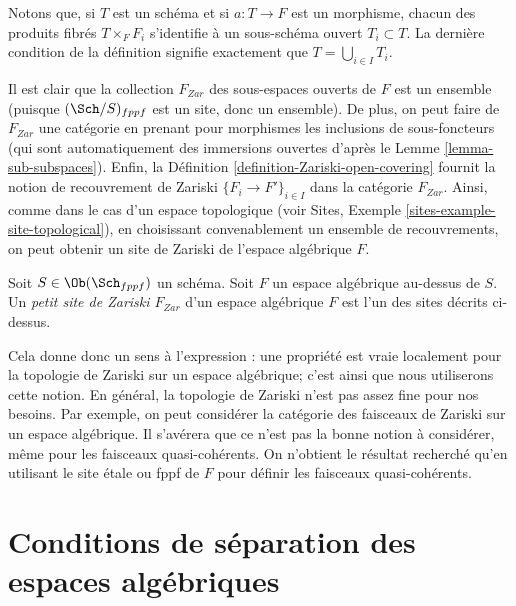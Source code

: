 \noindent
Notons que, si $T$ est un schéma
et si $a : T \to F$ est un morphisme, chacun des produits fibrés
$T \times_F F_i$ s'identifie à un sous-schéma ouvert
$T_i \subset T$. La dernière condition de la définition signifie
exactement que $T = \bigcup_{i \in I} T_i$.

\medskip\noindent
Il est clair que la collection $F_{Zar}$ des sous-espaces ouverts de
$F$ est un ensemble (puisque $(\Sch/S)_{fppf}$ est un site, donc un ensemble).
De plus, on peut faire de $F_{Zar}$ une catégorie en prenant pour
morphismes les inclusions de sous-foncteurs (qui sont automatiquement des immersions
ouvertes d'après le Lemme \ref{lemma-sub-subspaces}). Enfin, la
Définition \ref{definition-Zariski-open-covering}
fournit la notion de recouvrement de Zariski $\{F_i \to F'\}_{i \in I}$
dans la catégorie $F_{Zar}$. Ainsi, comme dans le cas d'un espace topologique
(voir Sites, Exemple \ref{sites-example-site-topological}),
en choisissant convenablement un ensemble de recouvrements,
on peut obtenir un site de Zariski de l'espace algébrique $F$.

\begin{definition}
\label{definition-small-Zariski-site}
Soit $S \in \Ob(\Sch_{fppf})$ un schéma. Soit $F$ un espace algébrique au-dessus de
$S$. Un {\it petit site de Zariski $F_{Zar}$} d'un espace algébrique $F$ est l'un
des sites décrits ci-dessus.
\end{definition}

\noindent
Cela donne donc un sens à l'expression : une propriété est vraie
localement pour la topologie de Zariski sur un espace algébrique; c'est ainsi que nous utiliserons cette
notion. En général, la topologie de Zariski n'est pas assez fine pour nos
besoins. Par exemple, on peut considérer la catégorie des faisceaux de Zariski
sur un espace algébrique. Il s'avérera que ce n'est pas la
bonne notion à considérer, même pour les faisceaux quasi-cohérents.
On n'obtient le résultat recherché qu'en utilisant le site \'etale ou fppf de
$F$ pour définir les faisceaux quasi-cohérents.











\section{Conditions de séparation des espaces algébriques}
\label{section-separation}

